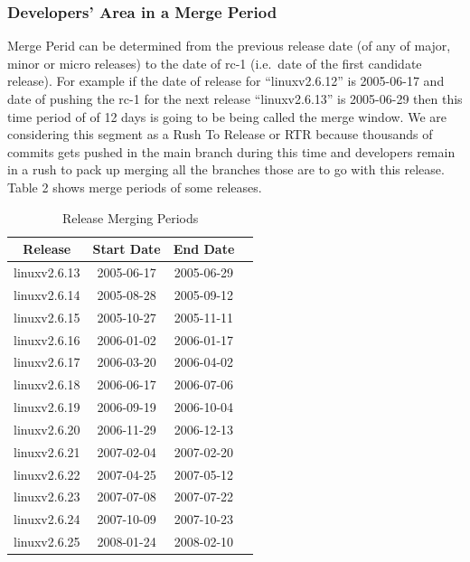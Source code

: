 \documentclass{acm_proc_article-sp}
\begin{document}
\subsubsection{Developers' Area in a Merge Period}
Merge Perid can be determined from the previous release date (of any of major, minor or micro releases) to the date of rc-1 (i.e.\ date of the first candidate release). For example if the date of release for ``linuxv2.6.12''  is 2005-06-17 and date of pushing the rc-1 for the next release ``linuxv2.6.13'' is 2005-06-29 then this time period of of 12 days is going to be being called the merge window. We are considering this segment as a Rush To Release or RTR because thousands of commits gets pushed in the main branch during this time and developers remain in a rush to pack up merging all the branches those are to go with this release. Table 2 shows merge periods of some releases.

\begin{table}[ht]
\caption{Release Merging Periods}  %
\centering 						%
\begin{tabular}{c c c c}				%
\hline\hline						%
Release 			& Start Date		& End Date \\ [0.5ex]
\hline 							%
linuxv2.6.13		& 2005-06-17	& 2005-06-29 \\
linuxv2.6.14		& 2005-08-28	& 2005-09-12 \\
linuxv2.6.15		& 2005-10-27	& 2005-11-11 \\
linuxv2.6.16		& 2006-01-02	& 2006-01-17 \\
linuxv2.6.17		& 2006-03-20	& 2006-04-02 \\
linuxv2.6.18		& 2006-06-17	& 2006-07-06 \\
linuxv2.6.19		& 2006-09-19	& 2006-10-04 \\
linuxv2.6.20  		& 2006-11-29	& 2006-12-13 \\
linuxv2.6.21		& 2007-02-04	& 2007-02-20 \\
linuxv2.6.22		& 2007-04-25	& 2007-05-12 \\
linuxv2.6.23		& 2007-07-08	& 2007-07-22 \\
linuxv2.6.24		& 2007-10-09	& 2007-10-23 \\
linuxv2.6.25		& 2008-01-24	& 2008-02-10 \\
[1ex]							%
\hline 							%
\end{tabular}
\label{table:nonlin} 				%
\end{table}
\end{document}
